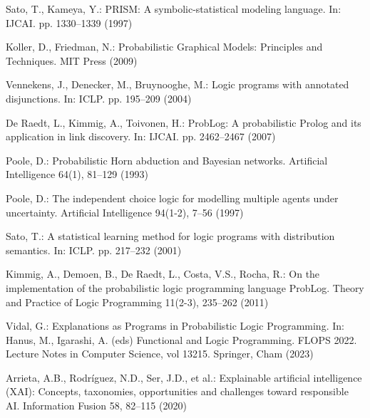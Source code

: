\begin{singlespace}
\begin{thebibliography}{}
 Sato, T., Kameya, Y.: PRISM: A symbolic-statistical modeling language. In: IJCAI. pp. 1330--1339 (1997)

 Koller, D., Friedman, N.: Probabilistic Graphical Models: Principles and Techniques. MIT Press (2009)

 Vennekens, J., Denecker, M., Bruynooghe, M.: Logic programs with annotated disjunctions. In: ICLP. pp. 195--209 (2004)

 De Raedt, L., Kimmig, A., Toivonen, H.: ProbLog: A probabilistic Prolog and its application in link discovery. In: IJCAI. pp. 2462--2467 (2007)

 Poole, D.: Probabilistic Horn abduction and Bayesian networks. Artificial Intelligence 64(1), 81--129 (1993)

 Poole, D.: The independent choice logic for modelling multiple agents under uncertainty. Artificial Intelligence 94(1-2), 7--56 (1997)

 Sato, T.: A statistical learning method for logic programs with distribution semantics. In: ICLP. pp. 217--232 (2001)

 Kimmig, A., Demoen, B., De Raedt, L., Costa, V.S., Rocha, R.: On the implementation of the probabilistic logic programming language ProbLog. Theory and Practice of Logic Programming 11(2-3), 235--262 (2011)

 Vidal, G.: Explanations as Programs in Probabilistic Logic Programming. In: Hanus, M., Igarashi, A. (eds) Functional and Logic Programming. FLOPS 2022. Lecture Notes in Computer Science, vol 13215. Springer, Cham (2023)

 Arrieta, A.B., Rodríguez, N.D., Ser, J.D., et al.: Explainable artificial intelligence (XAI): Concepts, taxonomies, opportunities and challenges toward responsible AI. Information Fusion 58, 82--115 (2020)

\end{thebibliography}

\end{singlespace}
